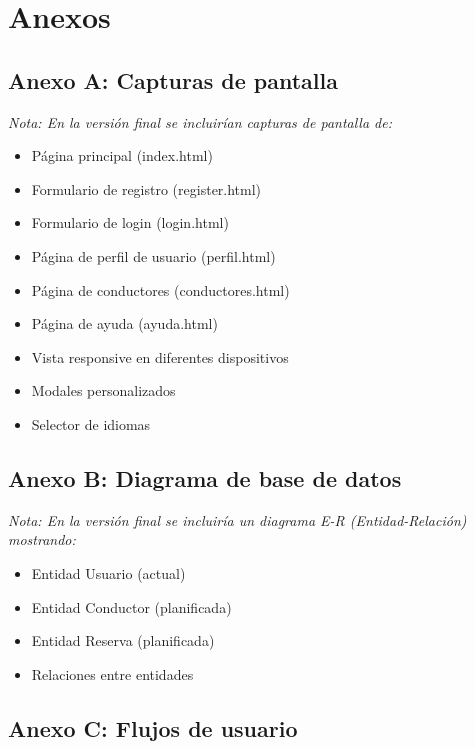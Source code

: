 \documentclass[12pt,a4paper]{article}
\begin{document}
\newpage

\section*{Anexos}

\subsection*{Anexo A: Capturas de pantalla}

\textit{Nota: En la versión final se incluirían capturas de pantalla de:}
\begin{itemize}
    \item Página principal (index.html)
    \item Formulario de registro (register.html)
    \item Formulario de login (login.html)
    \item Página de perfil de usuario (perfil.html)
    \item Página de conductores (conductores.html)
    \item Página de ayuda (ayuda.html)
    \item Vista responsive en diferentes dispositivos
    \item Modales personalizados
    \item Selector de idiomas
\end{itemize}

\subsection*{Anexo B: Diagrama de base de datos}

\textit{Nota: En la versión final se incluiría un diagrama E-R (Entidad-Relación) mostrando:}
\begin{itemize}
    \item Entidad Usuario (actual)
    \item Entidad Conductor (planificada)
    \item Entidad Reserva (planificada)
    \item Relaciones entre entidades
\end{itemize}

\subsection*{Anexo C: Flujos de usuario}
\end{document}
